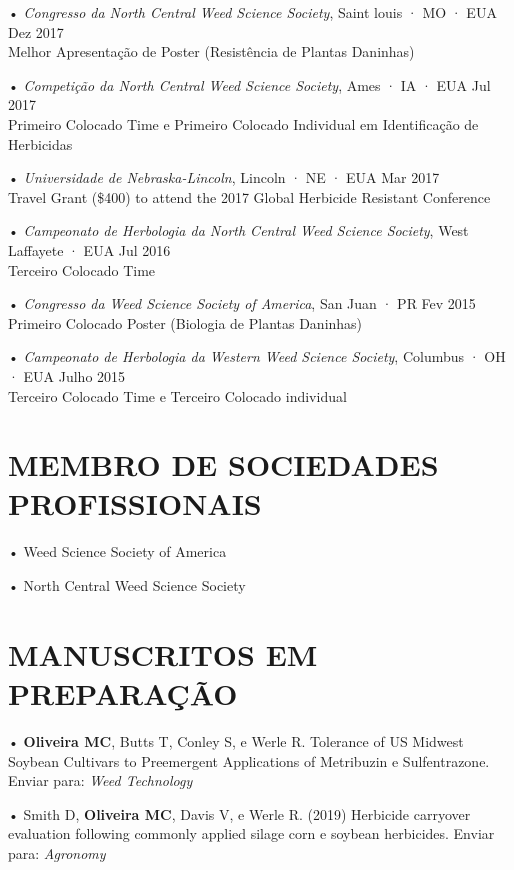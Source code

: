 \documentclass[11pt,]{article}
\begin{document}
• \emph{Congresso da North Central Weed Science Society}, Saint louis ·
MO · EUA \hfill Dez 2017\\
Melhor Apresentação de Poster (Resistência de Plantas Daninhas)

• \emph{Competição da North Central Weed Science Society}, Ames · IA ·
EUA \hfill Jul 2017\\
Primeiro Colocado Time e Primeiro Colocado Individual em Identificação
de Herbicidas

• \emph{Universidade de Nebraska-Lincoln}, Lincoln · NE · EUA \hfill Mar
2017\\
Travel Grant (\$400) to attend the 2017 Global Herbicide Resistant
Conference

• \emph{Campeonato de Herbologia da North Central Weed Science Society},
West Laffayete · EUA \hfill Jul 2016\\
Terceiro Colocado Time

• \emph{Congresso da Weed Science Society of America}, San Juan · PR
\hfill Fev 2015\\
Primeiro Colocado Poster (Biologia de Plantas Daninhas)

• \emph{Campeonato de Herbologia da Western Weed Science Society},
Columbus · OH · EUA \hfill Julho 2015\\
Terceiro Colocado Time e Terceiro Colocado individual

\hypertarget{membro-de-sociedades-profissionais}{%
\section{MEMBRO DE SOCIEDADES
PROFISSIONAIS}\label{membro-de-sociedades-profissionais}}

• Weed Science Society of America

• North Central Weed Science Society

\hypertarget{manuscritos-em-preparauxe7uxe3o}{%
\section{MANUSCRITOS EM
PREPARAÇÃO}\label{manuscritos-em-preparauxe7uxe3o}}

• \textbf{Oliveira MC}, Butts T, Conley S, e Werle R. Tolerance of US
Midwest Soybean Cultivars to Preemergent Applications of Metribuzin e
Sulfentrazone. Enviar para: \emph{Weed Technology}

• Smith D, \textbf{Oliveira MC}, Davis V, e Werle R. (2019) Herbicide
carryover evaluation following commonly applied silage corn e soybean
herbicides. Enviar para: \emph{Agronomy}
\end{document}
